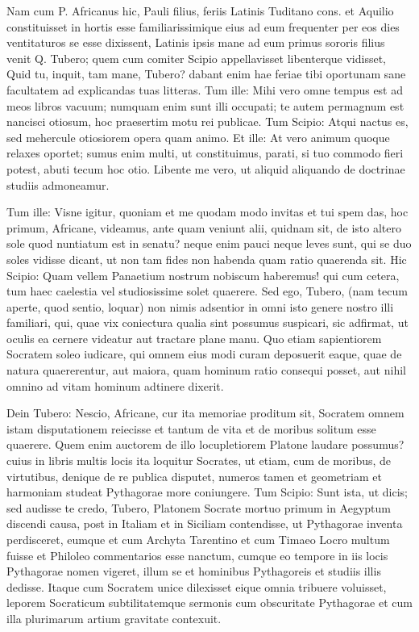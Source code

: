  Nam cum P. Africanus hic, Pauli filius, feriis Latinis Tuditano cons. et Aquilio constituisset in hortis esse familiarissimique eius ad eum frequenter per eos dies ventitaturos se esse dixissent, Latinis ipsis mane ad eum primus sororis filius venit Q. Tubero; quem cum comiter Scipio appellavisset libenterque vidisset, Quid tu, inquit, tam mane, Tubero? dabant enim hae feriae tibi oportunam sane facultatem ad explicandas tuas litteras. Tum ille: Mihi vero omne tempus est ad meos libros vacuum; numquam enim sunt illi occupati; te autem permagnum est nancisci otiosum, hoc praesertim motu rei publicae. Tum Scipio: Atqui nactus es, sed mehercule otiosiorem opera quam animo. Et ille: At vero animum quoque relaxes oportet; sumus enim multi, ut constituimus, parati, si tuo commodo fieri potest, abuti tecum hoc otio. Libente me vero, ut aliquid aliquando de doctrinae studiis admoneamur.

 Tum ille: Visne igitur, quoniam et me quodam modo invitas et tui spem das, hoc primum, Africane, videamus, ante quam veniunt alii, quidnam sit, de isto altero sole quod nuntiatum est in senatu? neque enim pauci neque leves sunt, qui se duo soles vidisse dicant, ut non tam fides non habenda quam ratio quaerenda sit. Hic Scipio: Quam vellem Panaetium nostrum nobiscum haberemus! qui cum cetera, tum haec caelestia vel studiosissime solet quaerere. Sed ego, Tubero, (nam tecum aperte, quod sentio, loquar) non nimis adsentior in omni isto genere nostro illi familiari, qui, quae vix coniectura qualia sint possumus suspicari, sic adfirmat, ut oculis ea cernere videatur aut tractare plane manu. Quo etiam sapientiorem Socratem soleo iudicare, qui omnem eius modi curam deposuerit eaque, quae de natura quaererentur, aut maiora, quam hominum ratio consequi posset, aut nihil omnino ad vitam hominum adtinere dixerit.

 Dein Tubero: Nescio, Africane, cur ita memoriae proditum sit, Socratem omnem istam disputationem reiecisse et tantum de vita et de moribus solitum esse quaerere. Quem enim auctorem de illo locupletiorem Platone laudare possumus? cuius in libris multis locis ita loquitur Socrates, ut etiam, cum de moribus, de virtutibus, denique de re publica disputet, numeros tamen et geometriam et harmoniam studeat Pythagorae more coniungere. Tum Scipio: Sunt ista, ut dicis; sed audisse te credo, Tubero, Platonem Socrate mortuo primum in Aegyptum discendi causa, post in Italiam et in Siciliam contendisse, ut Pythagorae inventa perdisceret, eumque et cum Archyta Tarentino et cum Timaeo Locro multum fuisse et Philoleo commentarios esse nanctum, cumque eo tempore in iis locis Pythagorae nomen vigeret, illum se et hominibus Pythagoreis et studiis illis dedisse. Itaque cum Socratem unice dilexisset eique omnia tribuere voluisset, leporem Socraticum subtilitatemque sermonis cum obscuritate Pythagorae et cum illa plurimarum artium gravitate contexuit.

